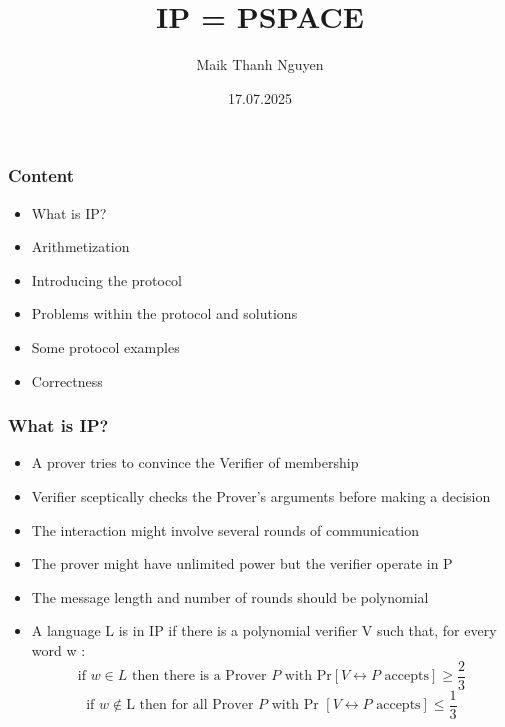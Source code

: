 \documentclass[hyperref={pdfpagelabels=false},t,10pt]{beamer}
\title{IP = PSPACE}
\author[Maik Thanh Nguyen]{Maik Thanh Nguyen}
\institute{Technische Universit\"at Dresden}
\date{17.07.2025}
\begin{document}
\addtocounter{framenumber}{-1}
\maketitle
\begin{frame}
  \frametitle{Content}
  \begin{itemize}
    \item What is IP?
    \item Arithmetization
    \item Introducing the protocol 
    \item Problems within the protocol and solutions
    \item Some protocol examples
    \item Correctness
  \end{itemize}
\end{frame}

\begin{frame}
  \frametitle{What is IP?}
  \begin{itemize}
    \item A prover tries to convince the Verifier of membership
    \item Verifier sceptically checks the Prover's arguments before making a decision
    \item The interaction might involve several rounds of communication
    \item The prover might have unlimited power but the verifier operate in P
    \item The message length and number of rounds should be polynomial \pause
    \item A language L is in IP if there is a polynomial verifier V such that, for every word w : 
    $$\mbox{if } w  \in L \mbox{ then there is a Prover } P \mbox{ with } \mbox{Pr} [V\leftrightarrow P \mbox{ accepts}]  \geq \frac{2}{3}$$
    $$\mbox{if } w \notin \mbox{L then for all Prover } P \mbox{ with } \mbox{Pr }[V \leftrightarrow P \mbox{   accepts}] \leq \frac{1}{3}$$
    
  \end{itemize}
\end{frame}
\end{document}
